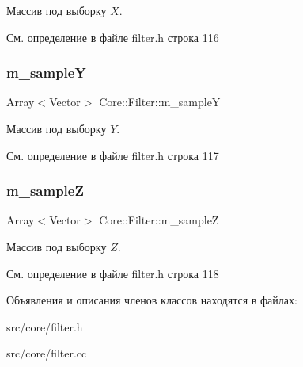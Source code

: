 Массив под выборку $X$. 

См. определение в файле filter.\+h строка 116

\hypertarget{class_core_1_1_filter_a3e2e475b650504bb7c800e3f27364580}{}\label{class_core_1_1_filter_a3e2e475b650504bb7c800e3f27364580} 
\subsubsection{\texorpdfstring{m\+\_\+sampleY}{m\_sampleY}}
{\footnotesize\ttfamily Array$<$Vector$>$ Core\+::\+Filter\+::m\+\_\+sampleY\hspace{0.3cm}{\ttfamily [protected]}}

Массив под выборку $Y$. 

См. определение в файле filter.\+h строка 117

\hypertarget{class_core_1_1_filter_af0e905e89bc5db8e07f283b68fb57a60}{}\label{class_core_1_1_filter_af0e905e89bc5db8e07f283b68fb57a60} 
\subsubsection{\texorpdfstring{m\+\_\+sampleZ}{m\_sampleZ}}
{\footnotesize\ttfamily Array$<$Vector$>$ Core\+::\+Filter\+::m\+\_\+sampleZ\hspace{0.3cm}{\ttfamily [protected]}}

Массив под выборку $Z$. 

См. определение в файле filter.\+h строка 118



Объявления и описания членов классов находятся в файлах\+:\begin{DoxyCompactItemize}
\item 
src/core/filter.\+h\item 
src/core/filter.\+cc\end{DoxyCompactItemize}
